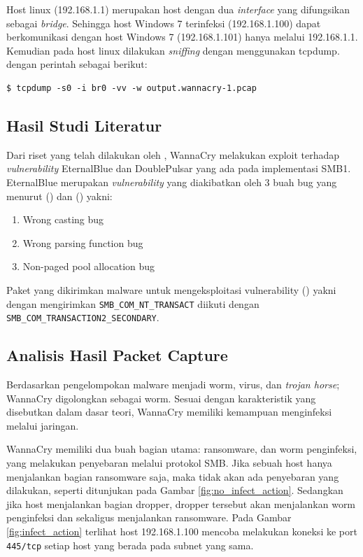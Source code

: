Host linux (192.168.1.1) merupakan host dengan dua \textit{interface} yang difungsikan sebagai \textit{bridge}. Sehingga host Windows 7 terinfeksi (192.168.1.100) dapat berkomunikasi dengan host Windows 7 (192.168.1.101) hanya melalui 192.168.1.1. Kemudian pada host linux dilakukan \textit{sniffing} dengan menggunakan tcpdump. dengan perintah sebagai berikut:

\begin{verbatim}
$ tcpdump -s0 -i br0 -vv -w output.wannacry-1.pcap
\end{verbatim}

\subsection{Hasil Studi Literatur}

Dari riset yang telah dilakukan oleh \cite{islam2018smb}, WannaCry melakukan exploit terhadap \textit{vulnerability} EternalBlue dan DoublePulsar yang ada pada implementasi SMB1. EternalBlue merupakan \textit{vulnerability} yang diakibatkan oleh 3 buah bug yang menurut (\cite{islam2018smb}) dan (\cite{grossman2017check}) yakni:
\begin{enumerate}
	\item Wrong casting bug
	\item Wrong parsing function bug
	\item Non-paged pool allocation bug
\end{enumerate}

Paket yang dikirimkan malware untuk mengeksploitasi vulnerability (\cite{islam2018smb}) yakni dengan mengirimkan \verb|SMB_COM_NT_TRANSACT|  diikuti dengan \verb|SMB_COM_TRANSACTION2_SECONDARY|.

\subsection{Analisis Hasil Packet Capture}

Berdasarkan pengelompokan malware menjadi worm, virus, dan \textit{trojan horse}; WannaCry digolongkan sebagai worm. Sesuai dengan karakteristik yang disebutkan dalam dasar teori, WannaCry memiliki kemampuan menginfeksi melalui jaringan.

WannaCry memiliki dua buah bagian utama: ransomware, dan worm penginfeksi, yang melakukan penyebaran melalui protokol SMB. Jika sebuah host hanya menjalankan bagian ransomware saja, maka tidak akan ada penyebaran yang dilakukan, seperti ditunjukan pada Gambar \ref{fig:no_infect_action}. Sedangkan jika host menjalankan bagian dropper, dropper tersebut akan menjalankan worm penginfeksi dan sekaligus menjalankan ransomware. Pada Gambar \ref{fig:infect_action} terlihat host 192.168.1.100  mencoba melakukan koneksi ke port \verb|445/tcp| setiap host yang berada pada subnet yang sama.

